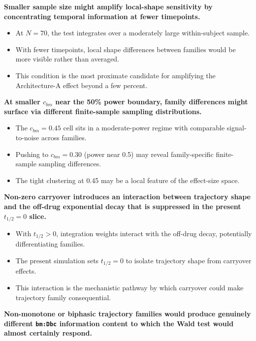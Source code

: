 \documentclass[
  11pt,
]{article}
\begin{document}
\textbf{Smaller sample size might amplify local-shape
sensitivity by concentrating temporal information at fewer
timepoints.}

\begin{itemize}\setlength{\itemsep}{2pt}\setlength{\parskip}{0pt}
\item At $N = 70$, the test integrates over a moderately
  large within-subject sample.
\item With fewer timepoints, local shape differences between
  families would be more visible rather than averaged.
\item This condition is the most proximate candidate for
  amplifying the Architecture-A effect beyond a few percent.
\end{itemize}

\textbf{At smaller $c_{bm}$ near the 50\% power boundary,
family differences might surface via different finite-sample
sampling distributions.}

\begin{itemize}\setlength{\itemsep}{2pt}\setlength{\parskip}{0pt}
\item The $c_{bm} = 0.45$ cell sits in a moderate-power
  regime with comparable signal-to-noise across families.
\item Pushing to $c_{bm} = 0.30$ (power near 0.5) may reveal
  family-specific finite-sample sampling differences.
\item The tight clustering at 0.45 may be a local feature of
  the effect-size space.
\end{itemize}

\textbf{Non-zero carryover introduces an interaction between
trajectory shape and the off-drug exponential decay that is
suppressed in the present $t_{1/2} = 0$ slice.}

\begin{itemize}\setlength{\itemsep}{2pt}\setlength{\parskip}{0pt}
\item With $t_{1/2} > 0$, integration weights interact with
  the off-drug decay, potentially differentiating families.
\item The present simulation sets $t_{1/2} = 0$ to isolate
  trajectory shape from carryover effects.
\item This interaction is the mechanistic pathway by which
  carryover could make trajectory family consequential.
\end{itemize}

\textbf{Non-monotone or biphasic trajectory families would
produce genuinely different \texttt{bm:Dbc} information content to
which the Wald test would almost certainly respond.}
\end{document}
